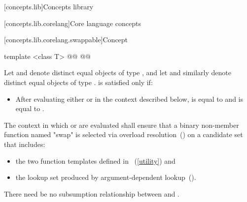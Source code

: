 
\setcounter{chapter}{21}
[concepts.lib]{Concepts library}

\setcounter{section}{2}
[concepts.lib.corelang]{Core language concepts}

\setcounter{subsection}{10}
[concepts.lib.corelang.swappable]{Concept }


%
\begin{itemdecl}
template <class T>
@@
@@
\end{itemdecl}

{\color{remclr}
\begin{itemdescr}
\pnum
Let  and  denote distinct equal objects of type ,
and let  and  similarly denote distinct equal objects of type
.  is satisfied only if:
\begin{itemize}
\item After evaluating either  or  in the
  context described below,  is equal to  and  is
  equal to .
\end{itemize}

\pnum
The context in which  or  are evaluated shall ensure that a binary non-member
function named "swap" is selected via overload resolution~() on a candidate set that includes:
\begin{itemize}
\item the two  function templates defined in ~(\ref{utility}) and
\item the lookup set produced by argument-dependent lookup~().
\end{itemize}

\pnum
There need be no subsumption relationship between  and
.
\end{itemdescr}
} %

